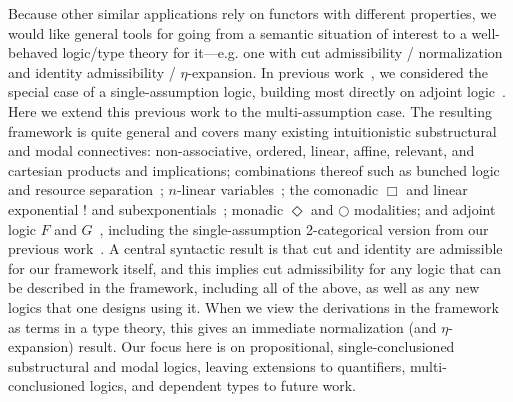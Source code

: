 \documentclass[a4paper,USenglish,numberwithinsect]{lipics-v2016}
\begin{document}
Because other similar applications rely on functors with different
properties, we would like general tools for going from a semantic
situation of interest to a well-behaved logic/type theory for
it---e.g. one with cut admissibility / normalization and identity
admissibility / $\eta$-expansion.  In previous work~\cite{ls16adjoint},
we considered the special case of a single-assumption logic, building
most directly on adjoint
logic~\cite{benton94mixed,bentonwadler96adjoint,reed09adjoint}.  Here we
extend this previous work to the multi-assumption case.  The resulting
framework is quite general and covers many existing intuitionistic
substructural and modal connectives: non-associative, ordered, linear,
affine, relevant, and cartesian products and implications; combinations
thereof such as bunched logic~\cite{ohearnpym99bunched} and resource
separation~\cite{atkey04separation}; $n$-linear
variables~\cite{reed08namessubstructural,abel15modal,mcbride16nuttin};
the comonadic $\Box$ and linear exponential $!$ and
subexponentials~\cite{nigammiller09subexponentials,danos+93subexponentials};
monadic $\Diamond$ and $\bigcirc$ modalities; and adjoint logic $F$ and
$G$~\cite{benton94mixed,bentonwadler96adjoint,reed09adjoint}, including
the single-assumption 2-categorical version from our previous
work~\cite{ls16adjoint}.  A central syntactic result is that cut and
identity are admissible for our framework itself, and this implies cut
admissibility for any logic that can be described in the framework,
including all of the above, as well as any new logics that one designs
using it.  When we view the derivations in the framework as terms in a
type theory, this gives an immediate normalization (and
$\eta$-expansion) result.  Our focus here is on propositional,
single-conclusioned substructural and modal logics, leaving extensions
to quantifiers, multi-conclusioned logics, and dependent types to future
work.
\end{document}
